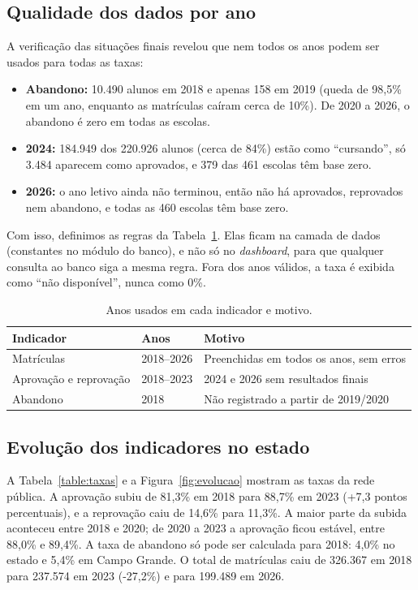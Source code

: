 \documentclass[preprint,10pt,5p]{elsarticle}
\begin{document}
\subsection{Qualidade dos dados por ano}

A verificação das situações finais revelou que nem todos os anos podem ser usados para todas as taxas:

\begin{itemize}
    \item \textbf{Abandono:} 10.490 alunos em 2018 e apenas 158 em 2019 (queda de 98,5\% em um ano, enquanto as matrículas caíram cerca de 10\%). De 2020 a 2026, o abandono é zero em todas as escolas.
    \item \textbf{2024:} 184.949 dos 220.926 alunos (cerca de 84\%) estão como ``cursando'', só 3.484 aparecem como aprovados, e 379 das 461 escolas têm base zero.
    \item \textbf{2026:} o ano letivo ainda não terminou, então não há aprovados, reprovados nem abandono, e todas as 460 escolas têm base zero.
\end{itemize}

Com isso, definimos as regras da Tabela~\ref{table:anos}. Elas ficam na camada de dados (constantes no módulo do banco), e não só no \textit{dashboard}, para que qualquer consulta ao banco siga a mesma regra. Fora dos anos válidos, a taxa é exibida como ``não disponível'', nunca como 0\%.

\begin{table}[h!]
\centering
\caption{Anos usados em cada indicador e motivo.}
\label{table:anos}
\begin{tabular}{p{2.1cm}p{1.6cm}p{3.6cm}}
\toprule
Indicador & Anos & Motivo \\
\midrule
Matrículas & 2018--2026 & Preenchidas em todos os anos, sem erros \\
Aprovação e reprovação & 2018--2023 & 2024 e 2026 sem resultados finais \\
Abandono & 2018 & Não registrado a partir de 2019/2020 \\
\bottomrule
\end{tabular}
\end{table}

\subsection{Evolução dos indicadores no estado}

A Tabela~\ref{table:taxas} e a Figura~\ref{fig:evolucao} mostram as taxas da rede pública. A aprovação subiu de 81,3\% em 2018 para 88,7\% em 2023 (+7,3 pontos percentuais), e a reprovação caiu de 14,6\% para 11,3\%. A maior parte da subida aconteceu entre 2018 e 2020; de 2020 a 2023 a aprovação ficou estável, entre 88,0\% e 89,4\%. A taxa de abandono só pode ser calculada para 2018: 4,0\% no estado e 5,4\% em Campo Grande. O total de matrículas caiu de 326.367 em 2018 para 237.574 em 2023 (-27,2\%) e para 199.489 em 2026.
\end{document}
